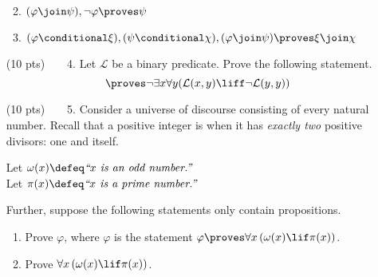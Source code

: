 \begin{enumerate}
\begin{enumerate}
      \item
        $(\varphi \join \psi), \neg \varphi \proves \psi$%
      \item
          $(\varphi \conditional \xi), (\psi \conditional \chi), (\varphi \join \psi) \proves \xi \join \chi$%
    \end{enumerate}
  \item[(10 pts)~~~~4.]
    Let $\mathcal{L}$ be a binary predicate.
    Prove the following statement.%
    \begin{equation*}
      \proves \neg \exists x \forall y (\mathcal{L}(x, y) \liff \neg \mathcal{L}(y, y))
    \end{equation*}
  \item[(10 pts)~~~~5.]
    Consider a universe of discourse consisting of every natural number.%
    Recall that a positive integer is  when it has \emph{exactly two} positive divisors: one and itself.

    Let $\omega(x) \defeq \emph{``}x\emph{ is an odd number.''}$ \\
    Let $\pi(x) \defeq \emph{``}x\emph{ is a prime number.''}$

    Further, suppose the following statements only contain propositions.
    \begin{enumerate}
      \item
        Prove $\varphi$, where $\varphi$ is the statement $\varphi \proves \forall x \left(\omega(x) \lif \pi(x)\right)$.
      \item
        Prove $\forall x \left(\omega(x) \lif \pi(x)\right)$.
  \end{enumerate}
\end{enumerate}


